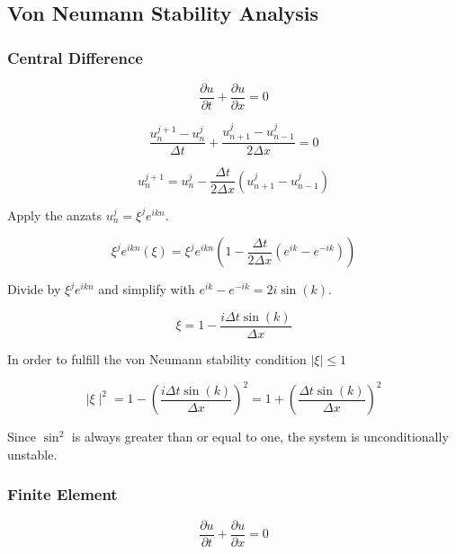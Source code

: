 \documentclass[a4paper,10pt,twoside]{article}
\begin{document}
\subsection{Von Neumann Stability Analysis}
\subsubsection{Central Difference}
\begin{equation}
    \frac{\partial u}{\partial t} + \frac{\partial u}{\partial x} = 0
\end{equation}

\begin{equation}
    \frac{u_{n}^{j+1} - u_{n}^j}{\Delta t} + \frac{u_{n+1}^j - u_{n-1}^j}{2 \Delta x} = 0
\end{equation}


\begin{equation}
    u_{n}^{j+1}  = u_{n}^j - \frac{\Delta t}{2 \Delta x} \left(u_{n+1}^j - u_{n-1}^j\right)
\end{equation}

Apply the anzats $u_n^j = \xi^j e^{ikn}$.

\begin{equation}
    \xi^{j} e^{ikn}(\xi) = \xi^je^{ikn} \left( 1 - \frac{\Delta t}{2 \Delta x} \left(e^{ik} - e^{-ik}\right)\right)
\end{equation}

Divide by $\xi^j e^{ikn}$ and simplify with $e^{ik} - e^{-ik} = 2i \sin(k)$.

\begin{equation}
    \xi = 1 - \frac{i\Delta t \sin(k)}{ \Delta x}
\end{equation}

In order to fulfill the von Neumann stability condition $\mid\xi\mid \leq 1$

\begin{equation}
    \mid \xi \mid^2 = 1 - \left(\frac{i\Delta t \sin(k)}{ \Delta x}\right)^2 = 1 + \left(\frac{\Delta t \sin(k)}{\Delta x}\right)^2
\end{equation}

Since $\sin^2$ is always greater than or equal to one, the system is unconditionally unstable.

\subsubsection{Finite Element}
\begin{equation}
    \frac{\partial u}{\partial t} + \frac{\partial u}{\partial x} = 0
\end{equation}
\end{document}
